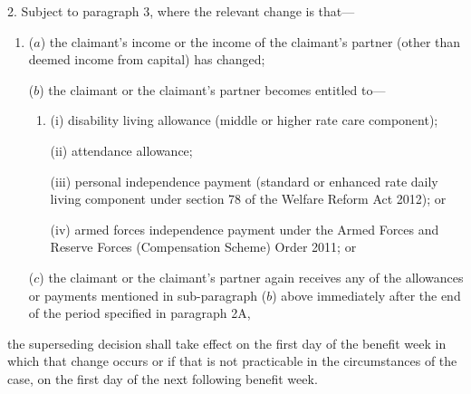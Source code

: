 \documentclass[12pt,a4paper]{article}
\begin{document}

\medskip

%

2.  Subject to paragraph 3, where the relevant change is that—
\begin{enumerate}\item[]
($a$) the claimant’s income or the income of the claimant’s partner (other than deemed income from capital) has changed;

($b$) the claimant or the claimant’s partner becomes entitled to—
\begin{enumerate}\item[]
(i) disability living allowance (middle or higher rate care component); 

(ii) attendance allowance; 

(iii) personal independence payment (standard or enhanced rate daily living component under section 78 of the Welfare Reform Act 2012); or

(iv) armed forces independence payment under the Armed Forces and Reserve Forces (Compensation Scheme) Order 2011; or
\end{enumerate}

($c$) the claimant or the claimant’s partner again receives 
any of the allowances or payments  %
mentioned in sub-paragraph ($b$) above immediately after the end of the period specified in paragraph 2A,
\end{enumerate}
the superseding decision shall take effect on the first day of the benefit week in which that change occurs or if that is not practicable in the circumstances of the case, on the first day of the next following benefit week.
\end{document}
